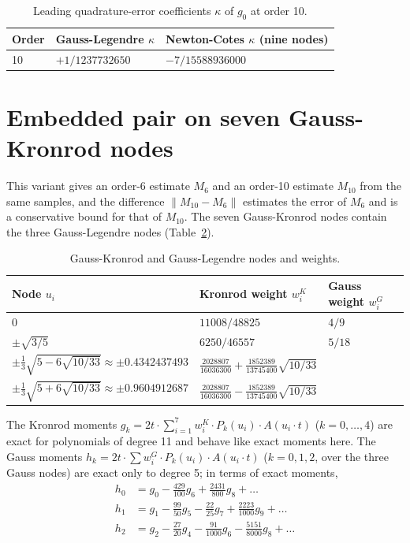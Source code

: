 \documentclass[12pt]{article}
\begin{document}
\begin{table}[H]
\centering\small
\caption{Leading quadrature-error coefficients $\kappa$ of $g_0$ at order 10.}\label{tab:kappa}
\begin{tabular}{lll}
\hline
Order & Gauss-Legendre $\kappa$ & Newton-Cotes $\kappa$ (nine nodes) \\ \hline
10 & $+1/1237732650$ & $-7/15588936000$ \\ \hline
\end{tabular}
\end{table}

\section*{Embedded pair on seven Gauss-Kronrod nodes}

This variant gives an order-6 estimate $M_6$ and an order-10 estimate $M_{10}$ from the same samples, and the difference $\|M_{10}-M_6\|$ estimates the error of $M_6$ and is a conservative bound for that of $M_{10}$. The seven Gauss-Kronrod nodes \cite{kronrod} contain the three Gauss-Legendre nodes (Table~\ref{tab:kronrod}).

\begin{table}[H]
\centering\small
\caption{Gauss-Kronrod and Gauss-Legendre nodes and weights.}\label{tab:kronrod}
\begin{tabular}{lll}
\hline
Node $u_i$ & Kronrod weight $w^K_i$ & Gauss weight $w^G_i$ \\ \hline
$0$ & $11008/48825$ & $4/9$ \\
$\pm\sqrt{3/5}$ & $6250/46557$ & $5/18$ \\
$\pm\frac{1}{3}\sqrt{5-6\sqrt{10/33}}\approx\pm0.4342437493$ & $\frac{2028807}{16036300}+\frac{1852389}{13745400}\sqrt{10/33}$ &  \\
$\pm\frac{1}{3}\sqrt{5+6\sqrt{10/33}}\approx\pm0.9604912687$ & $\frac{2028807}{16036300}-\frac{1852389}{13745400}\sqrt{10/33}$ &  \\ \hline
\end{tabular}
\end{table}

\noindent The Kronrod moments $g_k=2t\cdot\sum_{i=1}^{7}w^K_i\cdot P_k(u_i)\cdot A(u_i\cdot t)$ ($k=0,\ldots,4$) are exact for polynomials of degree 11 and behave like exact moments here. The Gauss moments $h_k=2t\cdot\sum w^G_i\cdot P_k(u_i)\cdot A(u_i\cdot t)$ ($k=0,1,2$, over the three Gauss nodes) are exact only to degree 5; in terms of exact moments,
\begin{equation}
\begin{aligned}
h_{0}&=g_{0}-\tfrac{429}{100}g_{6}+\tfrac{2431}{800}g_{8}+\ldots\\
h_{1}&=g_{1}-\tfrac{99}{50}g_{5}-\tfrac{22}{25}g_{7}+\tfrac{2223}{1000}g_{9}+\ldots\\
h_{2}&=g_{2}-\tfrac{27}{20}g_{4}-\tfrac{91}{1000}g_{6}-\tfrac{5151}{8000}g_{8}+\ldots
\end{aligned}\label{eq:hexp}
\end{equation}
\end{document}

